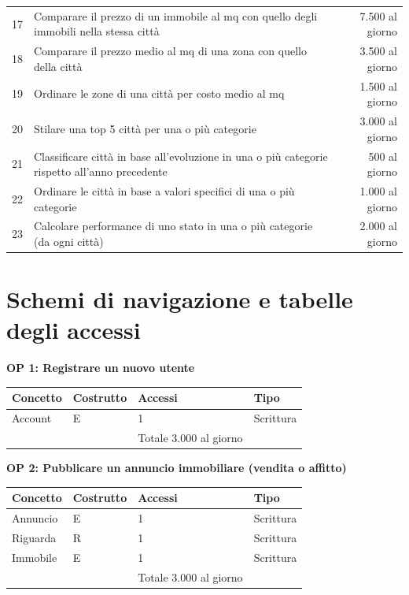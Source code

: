 \documentclass[a4paper,12pt]{report}
\begin{document}
\begin{table}[h!]
\begin{tabular}{||c l r||}
             17 & Comparare il prezzo di un immobile al mq con quello degli immobili nella stessa città & 7.500 al giorno \\
             18 & Comparare il prezzo medio al mq di una zona con quello della città & 3.500 al giorno \\ 
             19 & Ordinare le zone di una città per costo medio al mq & 1.500 al giorno \\
             20 & Stilare una top 5 città per una o più categorie & 3.000 al giorno \\
             21 & Classificare città in base all'evoluzione in una o più categorie rispetto all'anno precedente & 500 al giorno \\ 
             22 & Ordinare le città in base a valori specifici di una o più categorie & 1.000 al giorno \\ 
             23 & Calcolare performance di uno stato in una o più categorie (da ogni città) & 2.000 al giorno \\ [1ex] 
             \hline
             \end{tabular}
        \end{table}
        	
    	\section{Schemi di navigazione e tabelle degli accessi}
        	
        \textbf{OP 1: Registrare un nuovo utente}
        	\begin{table}[H]
            \centering
             \begin{tabular}{||l l l l||}
             \hline
             Concetto & Costrutto & Accessi & Tipo \\ [0.5ex] 
             \hline\hline
             Account & E & 1 & Scrittura \\ 
             \hline
              &   & Totale  3.000 al giorno &  \\ [1ex] 
             \hline
             \end{tabular}
            \end{table}

            \textbf{OP 2: Pubblicare un annuncio immobiliare (vendita o affitto)}
        	\begin{table}[H]
            \centering
             \begin{tabular}{||l l l l||}
             \hline
             Concetto & Costrutto & Accessi & Tipo \\ [0.5ex] 
             \hline\hline
             Annuncio & E & 1 & Scrittura \\ 
             Riguarda & R & 1 & Scrittura \\ 
             Immobile & E & 1 & Scrittura \\ 
             \hline
                &   & Totale  3.000 al giorno &  \\ [1ex] 
             \hline
             \end{tabular}
            \end{table}
\end{document}
